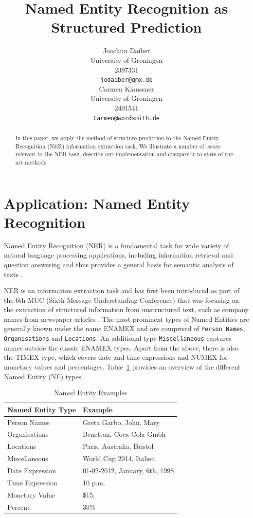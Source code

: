 \documentclass[11pt]{article}
\title{Named Entity Recognition as Structured Prediction}
\author{Joachim Daiber \\
  University of Groningen \\
  2397331\\
  {\tt jodaiber@gmx.de} \\\And
  Carmen Klaussner \\
  University of Groningen \\
  2401541\\
  {\tt Carmen@wordsmith.de} \\}
\date{}
\begin{document}
\maketitle

\begin{abstract}
In this paper, we apply the method of structure prediction to the Named Entity Recognition (NER) information extraction task. 
We illustrate a number of issues relevant to the NER task, describe our implementation and compare it to state-of-the art methods.
\end{abstract}


\section{Application: Named Entity Recognition}

Named Entity Recognition (NER) is a fundamental task for wide variety of natural language processing applications, including information retrieval and question answering
and thus provides a general basis for semantic analysis of texts \cite{Chen:2010:UDB:1870457.1870473}.

NER is an information extraction task and has first been introduced as part of the 6th MUC (Sixth Message Understanding Conference)
that was focusing on the extraction of structured information from unstructured text, such as company names from newspaper articles \cite{nadeau2007survey}.
The most prominent types of Named Entities are generally known under the name ENAMEX and are comprised of \texttt{Person Names}, \texttt{Organisations} and \texttt{Locations}.
An additional type \texttt{Miscellaneous} captures names outside the classic ENAMEX types.
Apart from the above, there is also the TIMEX type, which covers date and time expressions and NUMEX for monetary values and percentages.
Table~\ref{table:NETypes} provides an overview of the different Named Entity (NE) types.

\begin{table}[h!]
\scriptsize
\begin{tabular}{ l l }

\bf Named Entity Type & \bf Example \\
\hline 
Person Names & Greta Garbo, John, Mary \\
Organisations& Benetton, Coca-Cola Gmbh\\
Locations&  Paris, Australia, Bristol\\
Miscellaneous& World Cup 2014, Italien\\
 Date Expression& 01-02-2012, January, 6th, 1998 \\
Time Expression & 10 p.m.\\
Monetary Value &  \$15, \textsterling 100    \\
Percent &   30\% \\
\end{tabular}
\caption{Named Entity Examples}
\label{table:NETypes}
\end{table}
\end{document}
